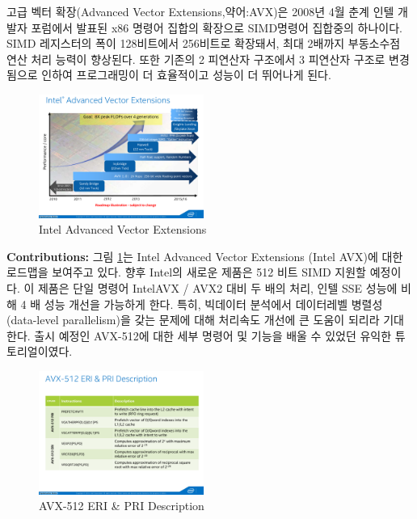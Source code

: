 \documentclass[twocolumn]{article}
\begin{document}
고급 벡터 확장(Advanced Vector Extensions,약어:AVX)은 2008년 4월 춘계 인텔 개발자 포럼에서 발표된 x86 명령어 집합의 확장으로 SIMD명령어 집합중의 하나이다. SIMD 레지스터의 폭이 128비트에서 256비트로 확장돼서, 최대 2배까지 부동소수점 연산 처리 능력이 향상된다. 또한 기존의 2 피연산자 구조에서 3 피연산자 구조로 변경됨으로 인하여 프로그래밍이 더 효율적이고 성능이 더 뛰어나게 된다. 

\begin{figure}[htb]
        \centering
        \includegraphics[width=0.48\textwidth]{intel-avx.pdf}
        \caption{Intel Advanced Vector Extensions}
        \label{fig:intel-avx}
\end{figure}

\noindent
\textbf{Contributions:} 그림 \ref{fig:intel-avx}는 Intel Advanced Vector Extensions (Intel AVX)에 대한 로드맵을 보여주고 있다.
향후 Intel의 새로운 제품은 512 비트 SIMD 지원할 예정이다. 이 제품은 단일 명령어 IntelAVX / AVX2 대비 두 배의 처리, 인텔 SSE 성능에 비해 4 배 성능 개선을 가능하게 한다. 특히, 빅데이터 분석에서 데이터레벨 병렬성 (data-level parallelism)을 갖는 문제에 대해 처리속도 개선에 큰 도움이 되리라 기대한다. 출시 예정인 AVX-512에 대한 세부 명령어 및 기능을 배울 수 있었던 유익한 튜토리얼이였다.

\begin{figure}[htb]
        \centering
        \includegraphics[width=0.48\textwidth]{intel-table.pdf}
        \caption{AVX-512 ERI \& PRI Description}
        \label{fig:intel-avx-description}
\end{figure}
\end{document}
